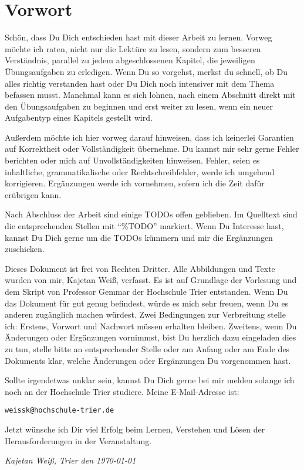 \chapter*{Vorwort}
Schön, dass Du Dich entschieden hast mit dieser Arbeit zu lernen. Vorweg möchte ich raten, nicht nur die Lektüre zu lesen, sondern zum besseren Verständnis, parallel zu jedem abgeschlossenen Kapitel, die jeweiligen Übungsaufgaben zu erledigen. Wenn Du so vorgehst, merkst du schnell, ob Du alles richtig verstanden hast oder Du Dich noch intensiver mit dem Thema befassen musst. Manchmal kann es sich lohnen, nach einem Abschnitt direkt mit den Übungsaufgaben zu beginnen und erst weiter zu lesen, wenn ein neuer Aufgabentyp eines Kapitels gestellt wird.

Außerdem möchte ich hier vorweg darauf hinweisen, dass ich keinerlei Garantien auf Korrektheit oder Vollständigkeit übernehme. Du kannst mir sehr gerne Fehler berichten oder mich auf Unvollständigkeiten hinweisen. Fehler, seien es inhaltliche, grammatikalische oder Rechtschreibfehler, werde ich umgehend korrigieren. Ergänzungen werde ich vornehmen, sofern ich die Zeit dafür erübrigen kann.

Nach Abschluss der Arbeit sind einige TODOs offen geblieben. Im Quelltext sind die entsprechenden Stellen mit "`\%TODO"' markiert. Wenn Du Interesse hast, kannst Du Dich gerne um die TODOs kümmern und mir die Ergänzungen zuschicken.

Dieses Dokument ist frei von Rechten Dritter. Alle Abbildungen und Texte wurden von mir, Kajetan Weiß, verfasst. Es ist auf Grundlage der Vorlesung und dem Skript von Professor Gemmar der Hochschule Trier entstanden. Wenn Du das Dokument für gut genug befindest, würde es mich sehr freuen, wenn Du es anderen zugänglich machen würdest. Zwei Bedingungen zur Verbreitung stelle ich: Erstens, Vorwort und Nachwort müssen erhalten bleiben. Zweitens, wenn Du Änderungen oder Ergänzungen vornimmst, bist Du herzlich dazu eingeladen dies zu tun, stelle bitte an entsprechender Stelle oder am Anfang oder am Ende des Dokuments klar, welche Änderungen oder Ergänzungen Du vorgenommen hast.

Sollte irgendetwas unklar sein, kannst Du Dich gerne bei mir melden solange ich noch an der Hochschule Trier studiere. Meine E-Mail-Adresse ist:
\begin{center}
	\texttt{weissk@hochschule-trier.de}
\end{center}

Jetzt wünsche ich Dir viel Erfolg beim Lernen, Verstehen und Lösen der Herausforderungen in der Veranstaltung.

\vspace{1cm}

\textsl{Kajetan Weiß, Trier den \today}